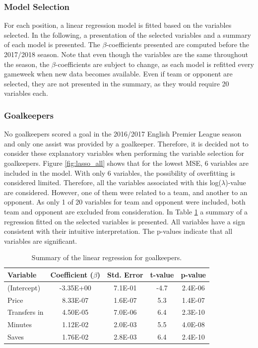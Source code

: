 \subsubsection{Model Selection}
For each position, a linear regression model is fitted based on the variables selected. In the following, a presentation of the selected variables and a summary of each model is presented. The $\beta$-coefficients presented are computed before the 2017/2018 season. Note that even though the variables are the same throughout the season, the $\beta$-coefficients are subject to change, as each model is refitted every gameweek when new data becomes available. Even if team or opponent are selected, they are not presented in the summary, as they would require 20 variables each.

\newpar

\subsubsection{Goalkeepers}

No goalkeepers scored a goal in the 2016/2017 English Premier League season and only one assist was provided by a goalkeeper. Therefore, it is decided not to consider these explanatory variables when performing the variable selection for goalkeepers. Figure \ref{fig:lasso_all} shows that for the lowest MSE, 6 variables are included in the model. With only 6 variables, the possibility of overfitting is considered limited. Therefore, all the variables associated with this log($\lambda$)-value are considered. However, one of them were related to a team, and another to an opponent. As only 1 of 20 variables for team and opponent were included, both team and opponent are excluded from consideration. In Table \ref{tab:coef_GLK} a summary of a regression fitted on the selected variables is presented. All variables have a sign consistent with their intuitive interpretation. The p-values indicate that all variables are significant. 

\begin{table}[H]
\centering
\begin{tabular}{|l|c|c|c|c|}
\hline
Variable     & Coefficient ($\beta$) & Std. Error & t-value & p-value \\ \hline
(Intercept)  & -3.35E+00    & 7.1E-01    & -4.7    & 2.4E-06               \\
Price         & 8.33E-07 & 1.6E-07    & 5.3     & 1.4E-07               \\
Transfers in & 4.50E-05 & 7.0E-06    & 6.4     & 2.3E-10               \\
Minutes      & 1.12E-02 & 2.0E-03    & 5.5     & 4.0E-08               \\
Saves        & 1.76E-02 & 2.8E-03    & 6.4     & 2.4E-10
\\
\hline
\end{tabular}
\caption{Summary of the linear regression for goalkeepers.}
\label{tab:coef_GLK}
\end{table}

